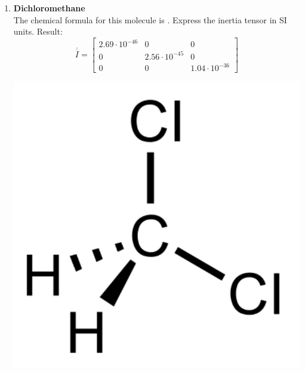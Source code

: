 \documentclass[11pt, a4paper, twoside]{article}
\begin{document}
\begin{enumerate}
	

	\item 
	\begin{minipage}[t][3cm]{0.73\textwidth}
	\textbf{Dichloromethane}\\
	The chemical formula for this molecule is . Express the inertia tensor in SI units.
		Result:\\
		\[
			\overline{\overline{I}} = \left[\begin{matrix}2.69 \cdot 10^{-46} & 0 & 0\\0 & 2.56 \cdot 10^{-45} & 0\\0 & 0 & 1.04 \cdot 10^{-36}\end{matrix}\right]
		\]
	\end{minipage}
	\begin{minipage}[c][0.5cm][t]{0.2\textwidth}
		\includegraphics[width=\textwidth]{figures/Dichloromethane_molecular_structure}
	\end{minipage}




\end{enumerate}
\end{document}
